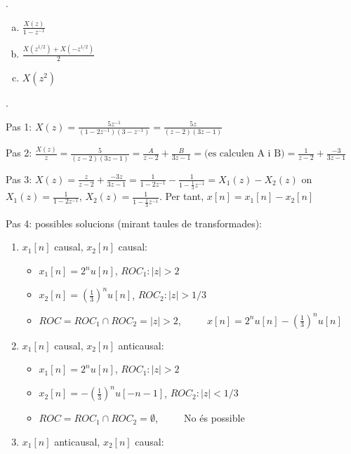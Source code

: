 \documentclass{article}
\begin{document}
.
\begin{enumerate}[(a)]
\item $\displaystyle \frac{X(z)}{1-z^{-1}}$
\item $\displaystyle \frac{X(z^{1/2})+X(-z^{1/2})}{2}$
\item $X(z^2)$
\end{enumerate}

. 
\begin{description}
\item{Pas 1:    }
$
\displaystyle
X(z)=\frac{5z^{-1}}{(1-2z^{-1})(3-z^{-1})} = \frac{5z}{(z-2)(3z-1)}
$
\item{Pas 2:    }
$
\displaystyle
\frac{X(z)}{z}= \frac{5}{(z-2)(3z-1)} = \frac{A}{z-2} + \frac{B}{3z-1} = \text{(es calculen A i B)} = \frac{1}{z-2} + \frac{-3}{3z-1}
$
\item{Pas 3:    }
$
\displaystyle
X(z)=  \frac{z}{z-2} + \frac{-3z}{3z-1} = \frac{1}{1-2z^{-1}} - \frac{1}{1-\frac{1}{3}z^{-1}} = X_1(z) - X_2(z)
$
\newline
on $ \displaystyle X_1(z)=  \frac{1}{1-2z^{-1}} $, $ \displaystyle X_2(z)=\frac{1}{1-\frac{1}{3}z^{-1}}$. 
\newline
Per tant, $x[n]=x_1[n]-x_2[n]$
\item{Pas 4:}   possibles solucions (mirant taules de transformades):
\begin{enumerate}
\item $x_1[n]$ causal, $x_2[n]$ causal:
\begin{itemize}
\item $\displaystyle x_1[n]=2^n u[n]$, $ROC_1: |z| > 2$
\item $\displaystyle x_2[n]=\left(\frac{1}{3}\right)^n u[n]$, $ROC_2: |z| > 1/3$
\item $\displaystyle ROC = ROC_1 \cap ROC_2 = |z| > 2$, $\qquad$ $x[n]=2^n u[n]-(\frac{1}{3})^n u[n]$
\end{itemize}
\item $x_1[n]$ causal, $x_2[n]$ anticausal:
\begin{itemize}
\item $\displaystyle x_1[n]=2^n u[n]$, $ROC_1: |z| > 2$
\item $\displaystyle x_2[n]=-\left(\frac{1}{3}\right)^n u[-n-1]$, $ROC_2: |z| < 1/3$
\item $\displaystyle ROC = ROC_1 \cap ROC_2 = \emptyset$, $\qquad$ No és possible
\end{itemize}
\item $x_1[n]$ anticausal, $x_2[n]$ causal:
\begin{itemize}

\end{itemize}
\end{enumerate}
\end{description}
\end{document}
